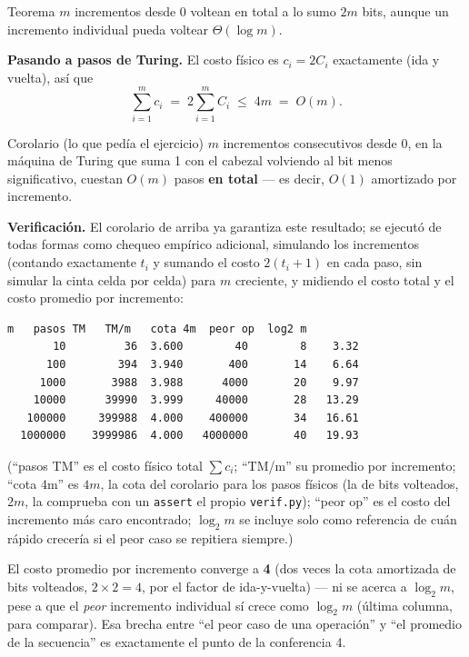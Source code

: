 \documentclass[11pt]{article}
\begin{document}
\begin{resultado}{Teorema}
$m$ incrementos desde 0 voltean en total a lo sumo $2m$ bits, aunque un incremento individual pueda
voltear $\Theta(\log m)$.
\end{resultado}

\textbf{Pasando a pasos de Turing.} El costo físico es $c_i=2C_i$ exactamente (ida y vuelta), así que
\[
\sum_{i=1}^m c_i \;=\; 2\sum_{i=1}^m C_i \;\le\; 4m \;=\; O(m).
\]

\begin{resultado}{Corolario (lo que pedía el ejercicio)}
$m$ incrementos consecutivos desde 0, en la máquina de Turing que suma 1 con el cabezal volviendo al bit
menos significativo, cuestan $O(m)$ pasos \textbf{en total} --- es decir, $O(1)$ amortizado por incremento.
\end{resultado}

\textbf{Verificación.} El corolario de arriba ya garantiza este resultado; se ejecutó de todas formas como
chequeo empírico adicional, simulando los incrementos (contando exactamente $t_i$ y sumando el costo
$2(t_i{+}1)$ en cada paso, sin simular la cinta celda por celda) para $m$ creciente, y midiendo el costo
total y el costo promedio por incremento:

\begin{lstlisting}[style=salida]
        m   pasos TM   TM/m   cota 4m  peor op  log2 m
       10         36  3.600        40        8    3.32
      100        394  3.940       400       14    6.64
     1000       3988  3.988      4000       20    9.97
    10000      39990  3.999     40000       28   13.29
   100000     399988  4.000    400000       34   16.61
  1000000    3999986  4.000   4000000       40   19.93
\end{lstlisting}
(``pasos TM'' es el costo físico total $\sum c_i$; ``TM/m'' su promedio por incremento; ``cota 4m'' es
$4m$, la cota del corolario para los pasos físicos (la de bits volteados, $2m$, la comprueba con un
\texttt{assert} el propio \texttt{verif.py}); ``peor op'' es el costo del incremento más caro
encontrado; $\log_2 m$ se incluye solo como referencia de cuán rápido crecería si el peor caso se repitiera
siempre.)

El costo promedio por incremento converge a \textbf{4} (dos veces la cota amortizada de bits
volteados, $2\times 2=4$, por el factor de ida-y-vuelta) --- ni se acerca a $\log_2 m$, pese a que el
\emph{peor} incremento individual sí crece como $\log_2 m$ (última columna, para comparar). Esa brecha
entre ``el peor caso de una operación'' y ``el promedio de la secuencia'' es exactamente el punto de la
conferencia 4.
\end{document}
